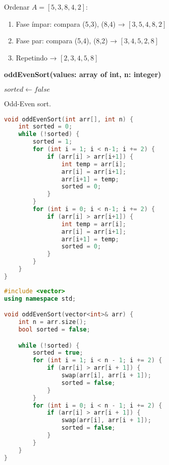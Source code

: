 \begin{exmp}
Ordenar $A = [5, 3, 8, 4, 2]$:

\begin{enumerate}
    \item Fase ímpar: compara (5,3), (8,4) → $[3, 5, 4, 8, 2]$
    \item Fase par: compara (5,4), (8,2) → $[3, 4, 5, 2, 8]$
    \item Repetindo → $[2, 3, 4, 5, 8]$
\end{enumerate}
\end{exmp}

\begin{center}
\begin{minipage}{.9\linewidth}
\begin{algorithm}[H]
\DontPrintSemicolon
\textbf{oddEvenSort(values: array of int, n: integer)}

$sorted \gets false$\;
\caption{Odd-Even sort.}
\label{lab:alg-oddEvenSort}
\end{algorithm}
\end{minipage}
\end{center}

\begin{lstlisting}[language=C,caption={Odd-Even sort em C},captionpos=t]
void oddEvenSort(int arr[], int n) {
    int sorted = 0;
    while (!sorted) {
        sorted = 1;
        for (int i = 1; i < n-1; i += 2) {
            if (arr[i] > arr[i+1]) {
                int temp = arr[i];
                arr[i] = arr[i+1];
                arr[i+1] = temp;
                sorted = 0;
            }
        }
        for (int i = 0; i < n-1; i += 2) {
            if (arr[i] > arr[i+1]) {
                int temp = arr[i];
                arr[i] = arr[i+1];
                arr[i+1] = temp;
                sorted = 0;
            }
        }
    }
}
\end{lstlisting}

\begin{lstlisting}[language=C++,caption={Odd-even sort em C++},captionpos=t]
#include <vector>
using namespace std;

void oddEvenSort(vector<int>& arr) {
    int n = arr.size();
    bool sorted = false;

    while (!sorted) {
        sorted = true;
        for (int i = 1; i < n - 1; i += 2) {
            if (arr[i] > arr[i + 1]) {
                swap(arr[i], arr[i + 1]);
                sorted = false;
            }
        }
        for (int i = 0; i < n - 1; i += 2) {
            if (arr[i] > arr[i + 1]) {
                swap(arr[i], arr[i + 1]);
                sorted = false;
            }
        }
    }
}
\end{lstlisting}

